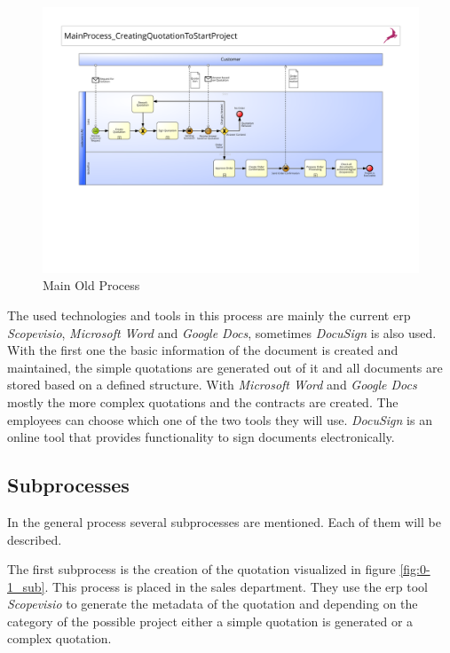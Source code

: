 \begin{figure}[h!]
	\begin{center}
		\includegraphics[width=\textheight,angle=90]{./appendix/pbmnOld/0_main.pdf}
		\caption{Main Old Process}\label{fig:0_main}
	\end{center}
\end{figure} 

The used technologies and tools in this process are mainly the current \gls{erp} \textit{Scopevisio}, \textit{Microsoft Word} and \textit{Google Docs}, sometimes \textit{DocuSign} is also used. With the first one the basic information of the document is created and maintained, the simple quotations are generated out of it and all documents are stored based on a defined structure. With \textit{Microsoft Word} and \textit{Google Docs} mostly the more complex quotations and the contracts are created. The employees can choose which one of the two tools they will use. \textit{DocuSign} is an online tool that provides functionality to sign documents electronically.

\subsection*{Subprocesses}
In the general process several subprocesses are mentioned. Each of them will be described.

The first subprocess is the creation of the quotation visualized in figure \ref{fig:0-1_sub}. This process is placed in the sales department. They use the \gls{erp} tool \textit{Scopevisio} to generate the metadata of the quotation and depending on the category of the possible project either a simple quotation is generated or a complex quotation.

